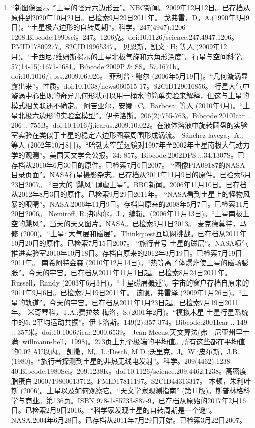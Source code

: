 \begin{enumerate}
\item “新图像显示了土星的怪异六边形云”。NBC新闻。2009年12月12日。已存档从原件到2020年10月21日。已检索9月29日2011年。
 戈弗雷，D。A.(1990年3月9日)。“土星极六边形的自转周期”。科学。247(4947):1206-1208.Bibcode:1990sci。247。1206克。doi:10.1126/science.247.4947.1206。PMID17809277。S2CID19965347。  
 贝恩斯，凯文·H; 等人 (2009年12月)。“卡西尼/维姆斯揭示的土星北极气旋和六角形深度”。行星与空间科学。57(14-15):1671-1681。Bibcode:2009P & SS。57.1671b。doi:10.1016/j.pss.2009.06.026。
 菲利普·鲍尔 (2006年5月19日)。“几何漩涡显露出来”。性质。doi:10.1038/news060515-17。S2CID129016856。 行星大气中漩涡中心出现的奇异几何形状可以用一桶水的简单实验来解释，但这与土星的模式相关联还不确定。
 阿吉亚尔，安娜·C。Barbosa; 等人 (2010年4月)。“土星北极六边形的实验室模型”。伊卡洛斯。206(2):755-763。Bibcode:2010Icar .. 206 .. 755B。doi:10.1016/j.icarus.2009.10.022。在液体溶液中旋转圆盘的实验室实验在类似于土星的稳定六边形图案周围形成涡流。
 Sánchez-lavega，A.; 等人 (2002年10月8日)。“哈勃太空望远镜对1997年至2002年土星南极大气动力学的观测”。美国天文学会公报。34: 857。Bibcode:2002DPS....34.1307S。已存档从2010年6月30日的原件。已检索7月6日2007。
 “图像PIA09187的NASA目录页面”。NASA行星摄影杂志。已存档从2011年11月9日的原件。已检索5月23日2007。
 “巨大的 '飓风' 肆虐土星”。BBC新闻。2006年11月10日。已存档从2012年8月3日的原件。已检索9月29日2011年。
 “NASA看到土星上的怪物风暴的眼睛”。NASA.2006年11月9日。存档自原来的2008年5月7日。已检索11月20日2006。
 Nemiroff, R.;邦内尔，J.，编辑。(2006年11月13日)。“土星南极上空的飓风”。当天的天文图片。NASA。已检索5月1日2013。
 麦克德莫特，马修 (2000)。“土星: 大气层和磁层”。Thinkquest互联网挑战。已存档从2011年10月20日的原件。已检索7月15日2007。
 “旅行者号-土星的磁层”。NASA喷气推进实验室2010年10月18日。存档自原来的2012年3月19日。已检索7月19日2011年。
 南希阿特金森 (2010年12月14日)。“热等离子体爆炸使土星的磁场膨胀”。今天的宇宙。已存档从2011年11月1日起。已检索8月24日2011年。
 Russell，Randy (2003年6月3日)。“土星磁层概述”。宇宙的窗户存档自原来的2011年9月6日。已检索7月19日2011年。
 该隐，弗雷泽 (2009年1月26日)。“土星的轨道”。今天的宇宙。已存档从2011年1月23日起。已检索7月19日2011年。
 米奇琴科，T.A.;费拉兹-梅洛，S.(2001年2月)。“模拟木星-土星行星系统中的5: 2平均运动共振”。伊卡洛斯。149(2):357-374。Bibcode:2001Icar .. 149 .. 357米。doi:10.1006/icar.2000.6539。
 Jean Meeus,天文算法(弗吉尼亚州里士满: willmann-bell，1998)。273页上九个极端的平均值。所有这些都在平均值的0.02 AU以内。
 凯撒，M。L.;Desch, M.D.;沃里克，J。W.;皮尔斯，J.B.(1980)。“旅行者探测到土星的非热无线电发射”。科学。209(4462):1238-40.Bibcode:1980Sci。209.1238K。doi:10.1126/science.209.4462.1238。高密度脂蛋白:2060/19800013712。PMID17811197。S2CID44313317。  
 本顿，朱利叶斯 (2006)。土星以及如何观察它。“天文学家观测指南” (第11版)。斯普林格科学与商业。第136页。ISBN 978-1-85233-887-9。已存档从原始的2017年2月16日。已检索2月9日2016。
 “科学家发现土星的自转周期是一个谜”。NASA.2004年6月28日。已存档从2011年7月29日开始。已检索3月22日2007。

 \end{enumerate}










